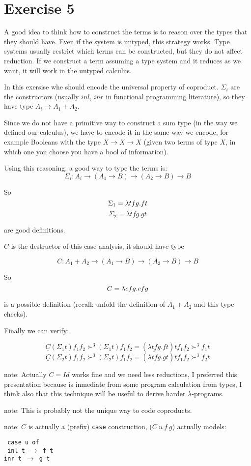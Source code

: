 
\section*{Exercise 5}

A good idea to think how to construct the terms is to reason over the
types that they should have. Even if the system is untyped, this
strategy works. Type systems usually restrict which terms can be constructed,
but they do not affect reduction. If we construct a term assuming a type
system and it reduces as we want, it will work in the untyped calculus.

In this exersise whe should encode the universal property of coproduct.
$\Sigma_i$ are the constructors (usually $inl$, $inr$ in functional
programming literature), so they have type $A_i \rightarrow A_1 + A_2$.

Since we do not have a primitive way to construct a sum type (in the way
we defined our calculus), we have to encode it in
the same way we encode, for example Booleans with the type
$ X \rightarrow X \rightarrow X$ (given two terms of type $X$,
in which one you choose you have a bool of information).

Using this reasoning, a good way to type the terms is:
$$\Sigma_i : A_i \rightarrow
            (A_1 \rightarrow B) \rightarrow
            (A_2 \rightarrow B) \rightarrow
            B
$$


So
$$
    \Sigma_1 = \lambda t f g . f t \\
$$
$$
    \Sigma_2 = \lambda t f g . g t
$$

are good definitions.

$C$ is the destructor of this case analysis, it should have type

$$
    C : A_1 + A_2 \rightarrow
       (A_1 \rightarrow B) \rightarrow
       (A_2 \rightarrow B) \rightarrow
       B
$$

So
$$
     C = \lambda c f g . c f g \\
$$

is a possible definition (recall: unfold the definition of $A_1 + A_2$
and this type checks).

Finally we can verify:

$$
    \underline{C} (\Sigma_1 t) f_1 f_2
    \succ^{3}  (\Sigma_1 t) f_1 f_2
    = (\underline{\lambda t f g} . f t) t f_1 f_2
    \succ^{3} f_1 t
$$
$$
    \underline{C} (\Sigma_2 t) f_1 f_2
    \succ^{3}  (\Sigma_2 t) f_1 f_2
    = (\underline{\lambda t f g} . g t) t f_1 f_2
    \succ^{3} f_2 t
$$

note: Actually $C = Id$ works fine and we need less reductions, I preferred
this presentation because is inmediate from some program calculation from
types, I think also that this technique will be useful to derive
harder $\lambda$-programs.

note: This is probably not the unique way to code coproducts.

note: $C$ is actually a (prefix) {\tt case} construction,
($C \: u \: f \: g$) actually models:

{\tt
  case u of\\
  {\setlength\parindent{24pt}
    \indent inl t  $\rightarrow$ f t\\
    \indent inr t  $\rightarrow$ g t
  }
}

